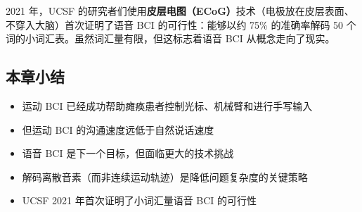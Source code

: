 2021 年，UCSF 的研究者们使用\textbf{皮层电图（ECoG）}技术（电极放在皮层表面、不穿入大脑）首次证明了语音 BCI 的可行性：能够以约 75\% 的准确率解码 50 个词的小词汇表。虽然词汇量有限，但这标志着语音 BCI 从概念走向了现实。

\subsection{本章小结}

\begin{itemize}
    \item 运动 BCI 已经成功帮助瘫痪患者控制光标、机械臂和进行手写输入
    \item 但运动 BCI 的沟通速度远低于自然说话速度
    \item 语音 BCI 是下一个目标，但面临更大的技术挑战
    \item 解码离散音素（而非连续运动轨迹）是降低问题复杂度的关键策略
    \item UCSF 2021 年首次证明了小词汇量语音 BCI 的可行性
\end{itemize}


